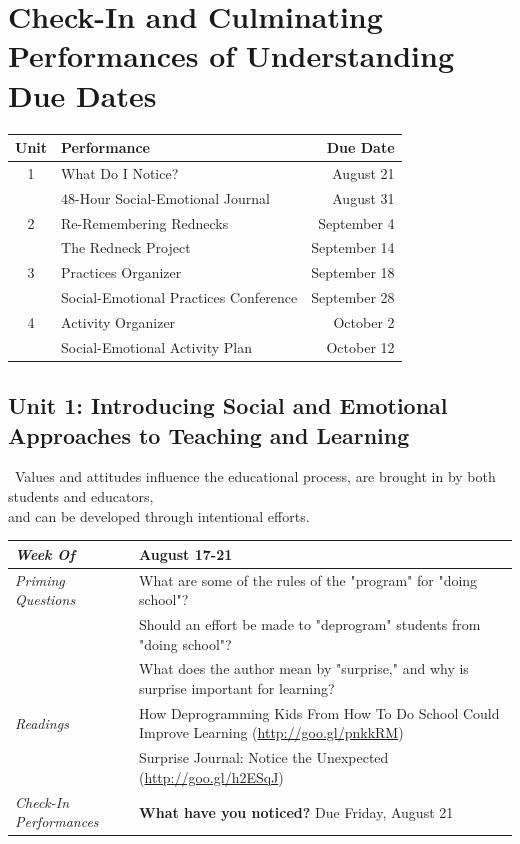\documentclass{tufte-handout}
\newcommand{\gentopic}[1]{\begin{fullwidth}\begin{center}\faKey~\textsf{#1}\end{center}\end{fullwidth}}
\newcommand{\tabpq}{\faQuestionSign\medspace\textit{Priming Questions}}
\newcommand{\tabread}{\faBook\medspace\textit{Readings}}
\newcommand{\tabdt}{\faCalendar\medspace\textit{Week Of}}
\newcommand{\tabcheckin}{\faPagelines\medspace\textit{Check-In Performances}}
\newenvironment{tabsched}
	{\small
	\begin{tabular}{p{1.5in}p{4.5in}}
	\midrule}
	{\midrule
	\end{tabular}
	\normalsize}
\newcommand{\weekone}{August 17-21}
\begin{document}
\medskip

\section{Check-In and Culminating Performances of Understanding Due Dates}
\begin{tabular}{clr}
	\toprule
	Unit & Performance & Due Date \\
	\midrule\midrule
	1 & What Do I Notice? & August 21 \\
	& 48-Hour Social-Emotional Journal & August 31 \\
	\midrule
	2 & Re-Remembering Rednecks & September 4 \\
	& The Redneck Project & September 14 \\
	\midrule
	3 & Practices Organizer & September 18 \\
	& Social-Emotional Practices Conference & September 28 \\
	\midrule
	4 & Activity Organizer & October 2 \\
	& Social-Emotional Activity Plan & October 12 \\
	\bottomrule
\end{tabular}

\begin{fullwidth}
	\section{Unit 1: Introducing Social and Emotional Approaches to Teaching and Learning}
\end{fullwidth}

\gentopic{Values and attitudes influence the educational process, are brought in by both students and educators,\\and can be developed through intentional efforts.}


\begin{tabsched}
	\tabdt & \weekone \\
	\midrule
	\tabpq & What are some of the rules of the "program" for "doing school"? \\
	& Should an effort be made to "deprogram" students from "doing school"? \\
	& What does the author mean by "surprise," and why is surprise important for learning? \\
	\midrule
	\tabread & How Deprogramming Kids From How To Do School Could Improve Learning (\url{http://goo.gl/pnkkRM}) \\
	& Surprise Journal: Notice the Unexpected (\url{http://goo.gl/h2ESqJ}) \\
	\midrule
	\tabcheckin & \textbf{What have you noticed?} Due Friday, August 21 \\
\end{tabsched}
\end{document}
